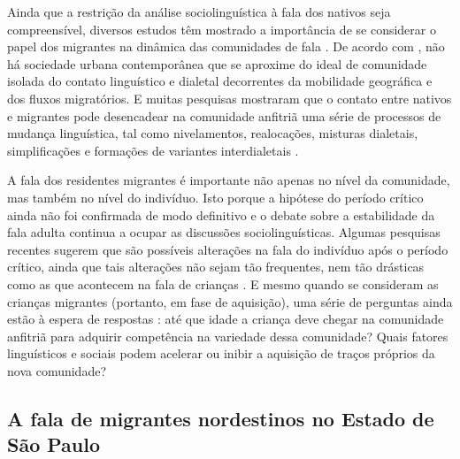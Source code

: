 \documentclass[
			a4paper,		%
			12pt,			%
			oneside,
			]{article}		%
\begin{document}
Ainda que a restrição da análise sociolinguística à fala dos nativos seja compreensível, 
diversos estudos têm mostrado a importância de se considerar o papel dos migrantes na 
dinâmica das comunidades de fala \citep{Britain2018, Bortoni-Ricardo2011, Trudgill1986}. 
De acordo com \citet{Milroy2002}, não há sociedade urbana contemporânea que se aproxime 
do ideal de comunidade isolada do contato linguístico e dialetal decorrentes da 
mobilidade geográfica e dos fluxos migratórios. E muitas pesquisas mostraram que o 
contato entre nativos e migrantes pode desencadear na comunidade anfitriã uma série de 
processos de mudança linguística, tal como nivelamentos, realocações, misturas dialetais, 
simplificações e formações de variantes interdialetais \citep{Trudgill1986}.

A fala dos residentes migrantes é importante não apenas no nível da comunidade, mas 
também no nível do indivíduo. Isto porque a hipótese do período crítico 
\citep{Lenneberg1967} ainda não foi confirmada de modo definitivo e o debate sobre a 
estabilidade da fala adulta continua a ocupar as discussões sociolinguísticas. Algumas 
pesquisas recentes sugerem que são possíveis alterações na fala do indivíduo após o 
período crítico, ainda que tais alterações não sejam tão frequentes, nem tão drásticas 
como as que acontecem na fala de crianças \citep{Cukor-Avila.Bailey2013}. E mesmo quando 
se consideram as crianças migrantes (portanto, em fase de aquisição), uma série de 
perguntas ainda estão à espera de respostas \citep{Oushiro2016, Nycz2015, Chambers1992, 
Trudgill1986}: até que idade a criança deve chegar na comunidade anfitriã para adquirir 
competência na variedade dessa comunidade? Quais fatores linguísticos e sociais podem 
acelerar ou inibir a aquisição de traços próprios da nova comunidade?

		\subsection{A fala de migrantes nordestinos no Estado de São Paulo}
		
\end{document}
